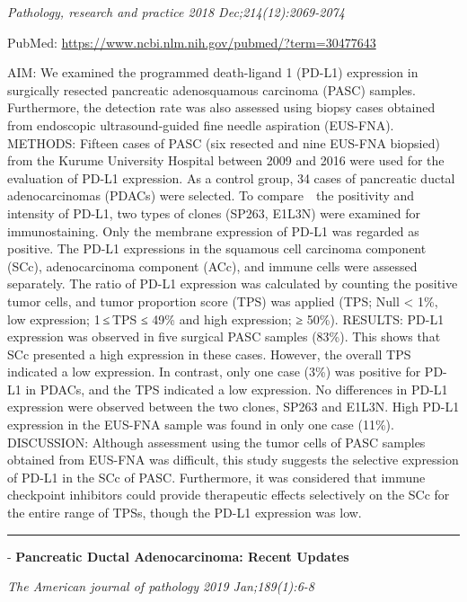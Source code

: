 \documentclass[]{article}
\begin{document}
\emph{Pathology, research and practice 2018 Dec;214(12):2069-2074}

PubMed: \url{https://www.ncbi.nlm.nih.gov/pubmed/?term=30477643}

AIM: We examined the programmed death-ligand 1 (PD-L1) expression in
surgically resected pancreatic adenosquamous carcinoma (PASC) samples.
Furthermore, the detection rate was also assessed using biopsy cases
obtained from endoscopic ultrasound-guided fine needle aspiration
(EUS-FNA). METHODS: Fifteen cases of PASC (six resected and nine EUS-FNA
biopsied) from the Kurume University Hospital between 2009 and 2016 were
used for the evaluation of PD-L1 expression. As a control group, 34
cases of pancreatic ductal adenocarcinomas (PDACs) were selected. To
compare　the positivity and intensity of PD-L1, two types of clones
(SP263, E1L3N) were examined for immunostaining. Only the membrane
expression of PD-L1 was regarded as positive. The PD-L1 expressions in
the squamous cell carcinoma component (SCc), adenocarcinoma component
(ACc), and immune cells were assessed separately. The ratio of PD-L1
expression was calculated by counting the positive tumor cells, and
tumor proportion score (TPS) was applied (TPS; Null \textless{} 1\%, low
expression; 1 ≤ TPS ≤ 49\% and high expression; ≥ 50\%). RESULTS: PD-L1
expression was observed in five surgical PASC samples (83\%). This shows
that SCc presented a high expression in these cases. However, the
overall TPS indicated a low expression. In contrast, only one case (3\%)
was positive for PD-L1 in PDACs, and the TPS indicated a low expression.
No differences in PD-L1 expression were observed between the two clones,
SP263 and E1L3N. High PD-L1 expression in the EUS-FNA sample was found
in only one case (11\%). DISCUSSION: Although assessment using the tumor
cells of PASC samples obtained from EUS-FNA was difficult, this study
suggests the selective expression of PD-L1 in the SCc of PASC.
Furthermore, it was considered that immune checkpoint inhibitors could
provide therapeutic effects selectively on the SCc for the entire range
of TPSs, though the PD-L1 expression was low.

{}

{}

\begin{center}\rule{0.5\linewidth}{\linethickness}\end{center}

 - \textbf{Pancreatic Ductal Adenocarcinoma: Recent Updates}

\emph{The American journal of pathology 2019 Jan;189(1):6-8}
\end{document}
